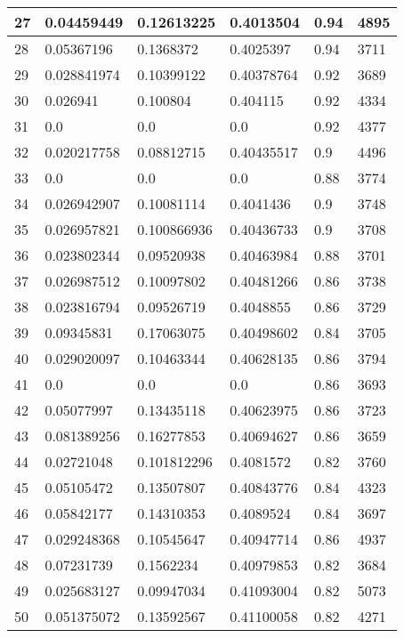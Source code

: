 \begin{longtable}{|l|l|l|l|l|l|}
27 & 0.04459449 & 0.12613225 & 0.4013504 & 0.94 & 4895 \\ \hline 
28 & 0.05367196 & 0.1368372 & 0.4025397 & 0.94 & 3711 \\ \hline 
29 & 0.028841974 & 0.10399122 & 0.40378764 & 0.92 & 3689 \\ \hline 
30 & 0.026941 & 0.100804 & 0.404115 & 0.92 & 4334 \\ \hline 
31 & 0.0 & 0.0 & 0.0 & 0.92 & 4377 \\ \hline 
32 & 0.020217758 & 0.08812715 & 0.40435517 & 0.9 & 4496 \\ \hline 
33 & 0.0 & 0.0 & 0.0 & 0.88 & 3774 \\ \hline 
34 & 0.026942907 & 0.10081114 & 0.4041436 & 0.9 & 3748 \\ \hline 
35 & 0.026957821 & 0.100866936 & 0.40436733 & 0.9 & 3708 \\ \hline 
36 & 0.023802344 & 0.09520938 & 0.40463984 & 0.88 & 3701 \\ \hline 
37 & 0.026987512 & 0.10097802 & 0.40481266 & 0.86 & 3738 \\ \hline 
38 & 0.023816794 & 0.09526719 & 0.4048855 & 0.86 & 3729 \\ \hline 
39 & 0.09345831 & 0.17063075 & 0.40498602 & 0.84 & 3705 \\ \hline 
40 & 0.029020097 & 0.10463344 & 0.40628135 & 0.86 & 3794 \\ \hline 
41 & 0.0 & 0.0 & 0.0 & 0.86 & 3693 \\ \hline 
42 & 0.05077997 & 0.13435118 & 0.40623975 & 0.86 & 3723 \\ \hline 
43 & 0.081389256 & 0.16277853 & 0.40694627 & 0.86 & 3659 \\ \hline 
44 & 0.02721048 & 0.101812296 & 0.4081572 & 0.82 & 3760 \\ \hline 
45 & 0.05105472 & 0.13507807 & 0.40843776 & 0.84 & 4323 \\ \hline 
46 & 0.05842177 & 0.14310353 & 0.4089524 & 0.84 & 3697 \\ \hline 
47 & 0.029248368 & 0.10545647 & 0.40947714 & 0.86 & 4937 \\ \hline 
48 & 0.07231739 & 0.1562234 & 0.40979853 & 0.82 & 3684 \\ \hline 
49 & 0.025683127 & 0.09947034 & 0.41093004 & 0.82 & 5073 \\ \hline 
50 & 0.051375072 & 0.13592567 & 0.41100058 & 0.82 & 4271 \\ \hline 
\end{longtable}